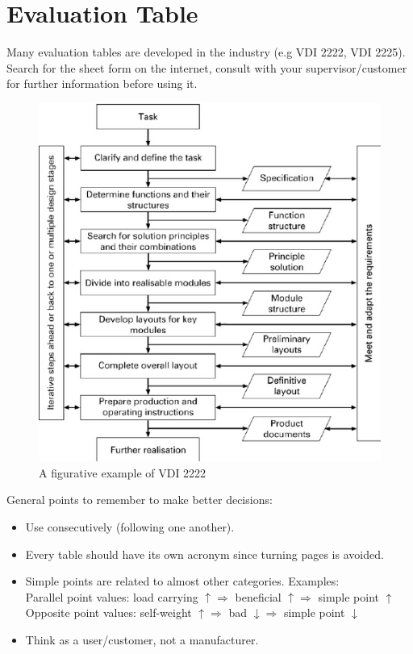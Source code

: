 \section{Evaluation Table}
Many evaluation tables are developed in the industry (e.g VDI 2222, VDI 2225). Search for the sheet form on the internet, consult with your supervisor/customer for further information before using it.
\begin{figure}[ht]
	\centering
	\includegraphics{images/01}
	\caption{A figurative example of VDI 2222}
	\label{fig:01}
\end{figure}

General points to remember to make better decisions:
\begin{itemize}
	\item Use consecutively (following one another).
	\item Every table should have its own acronym since turning pages is avoided.
	\item Simple points are related to almost other categories. Examples:\\
	Parallel point values: load carrying $ \uparrow \Rightarrow $ beneficial $ \uparrow \Rightarrow $ simple point $ \uparrow $\\
	Opposite point values: self-weight $ \uparrow \Rightarrow $ bad $ \downarrow \Rightarrow $ simple point $ \downarrow $
	\item Think as a user/customer, not a manufacturer.
\end{itemize}

